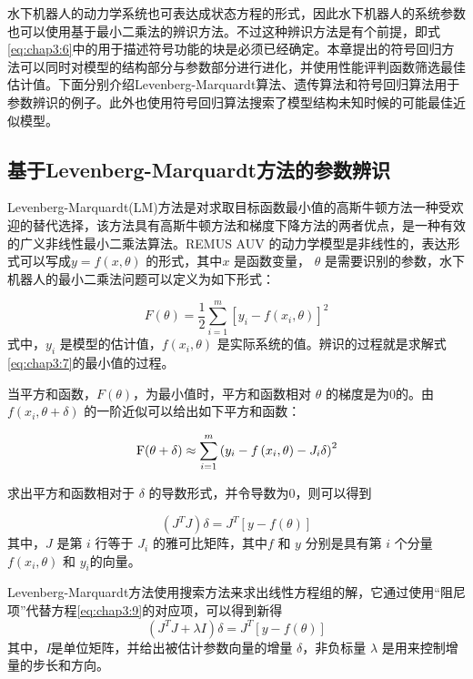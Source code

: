 水下机器人的动力学系统也可表达成状态方程的形式，因此水下机器人的系统参数也可以使用基于最小二乘法的辨识方法\cite{baruch2009levenberg}。不过这种辨识方法是有个前提，即式\ref{eq:chap3:6}中的用于描述符号功能的块是必须已经确定。本章提出的符号回归方法可以同时对模型的结构部分与参数部分进行进化，并使用性能评判函数筛选最佳估计值。下面分别介绍Levenberg-Marquardt算法、遗传算法和符号回归算法用于参数辨识的例子。此外也使用符号回归算法搜索了模型结构未知时候的可能最佳近似模型。

\subsection{基于Levenberg-Marquardt方法的参数辨识 }

 Levenberg-Marquardt(LM)方法是对求取目标函数最小值的高斯牛顿方法一种受欢迎的替代选择，该方法具有高斯牛顿方法和梯度下降方法的两者优点，是一种有效的广义非线性最小二乘法算法\cite{baruch2009levenberg}。REMUS AUV 的动力学模型是非线性的，表达形式可以写成$y=f(x,\theta)$ 的形式，其中$x$ 是函数变量， $\theta$ 是需要识别的参数，水下机器人的最小二乘法问题可以定义为如下形式：

\begin{equation}
\label{eq:chap3:7}
F\left( \theta  \right) = \frac{1}{2}\sum\limits_{i = 1}^m {{{\left[ {{y_i} - f\left( {{x_i},\theta } \right)} \right]}^2}}
\end{equation}
式中，$y_i$ 是模型的估计值，$f(x_i,\theta)$ 是实际系统的值。辨识的过程就是求解式\ref{eq:chap3:7}的最小值的过程。

当平方和函数，$ F(\theta)$，为最小值时，平方和函数相对 $\theta$ 的梯度是为0的。由 $f(x_i,\theta+\delta)$ 的一阶近似可以给出如下平方和函数：

\begin{equation}
\label{eq:chap3:8}
{\rm{F}}(\theta  + \delta ) \approx \sum\limits_{i = 1}^m {{{\left( {{y_i} - f\left( {{x_i},\theta } \right) - {J_i}\delta } \right)}^2}}
\end{equation}

求出平方和函数相对于 $\delta$ 的导数形式，并令导数为0，则可以得到

\begin{equation}
\label{eq:chap3:9}
\left( {{J^T}J} \right)\delta  = {J^T}\left[ {y - f\left( \theta  \right)} \right]
\end{equation}
其中，$J$ 是第 $i$ 行等于 $J_i$ 的雅可比矩阵，其中$f$ 和 $y$ 分别是具有第 $i$ 个分量 $f(x_i,\theta)$ 和 $y_i$的向量。

Levenberg-Marquardt方法使用搜索方法来求出线性方程组的解，它通过使用“阻尼项”代替方程\ref{eq:chap3:9}的对应项，可以得到新得
\begin{equation}
\label{eq:chap3:10}
\left( {{J^T}J + \lambda I} \right)\delta  = {J^T}\left[ {y - f\left( \theta  \right)} \right]
\end{equation}
其中，\textit{I}是单位矩阵，并给出被估计参数向量的增量 $
\delta$，非负标量 $\lambda$ 是用来控制增量的步长和方向。



